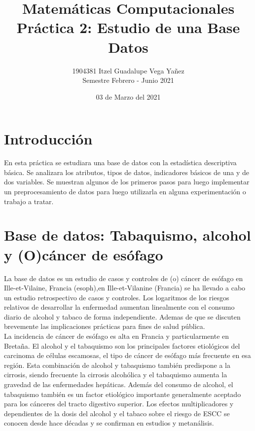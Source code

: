 \documentclass[12pt,a4paper]{article}
\title{Matemáticas Computacionales \\ Práctica 2: Estudio de una Base Datos}
\author{1904381 Itzel Guadalupe Vega Yañez \\ Semestre Febrero - Junio 2021}
\date{03 de Marzo del 2021}
\begin{document}
\maketitle

\section{Introducci\'{o}n}\label{sec:intro}

En esta práctica se estudiara una base de datos con la estadística descriptiva básica. Se analizara los atributos, tipos de datos, indicadores básicos de una y de dos variables. Se muestran algunos de los primeros pasos para luego implementar un preprocesamiento de datos para luego utilizarla en alguna experimentación o trabajo a tratar.

\section{Base de datos: Tabaquismo, alcohol y (O)cáncer de esófago} \label{sec:basededatos}

\onehalfspacing
La base de datos es un estudio de casos y controles de (o) cáncer de esófago en Ille-et-Vilaine, Francia (esoph),en Ille-et-Vilanine (Francia) se ha llevado a cabo un estudio retrospectivo de casos y controles. Los logaritmos de los riesgos relativos de desarrollar la enfermedad aumentan linealmente con el consumo diario de alcohol y tabaco de forma independiente. Ademas de que se discuten brevemente las implicaciones prácticas para fines de salud pública.\citep{article1}\\[8pt]
La incidencia de cáncer de esófago es alta en Francia y particularmente en Bretaña. El alcohol y el tabaquismo son los principales factores etiológicos del carcinoma de células escamosas, el tipo de cáncer de esófago más frecuente en esa región. Esta combinación de alcohol y tabaquismo también predispone a la cirrosis, siendo frecuente la cirrosis alcohólica y el tabaquismo aumenta la gravedad de las enfermedades hepáticas\citep{article2}. Además del consumo de alcohol, el tabaquismo también es un factor etiológico importante generalmente aceptado para los cánceres del tracto digestivo superior. Los efectos multiplicadores y dependientes de la dosis del alcohol y el tabaco sobre el riesgo de ESCC se conocen desde hace décadas y se confirman en estudios y metanálisis\citep{article3}.
\end{document}
